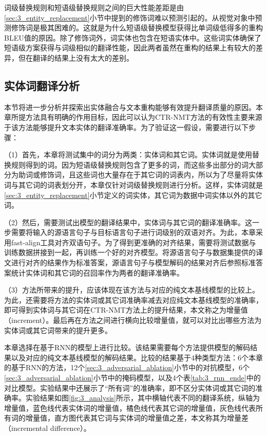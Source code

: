 词级替换规则和短语级替换规则之间的巨大性能差距是由\ref{sec:3_entity_replacement}小节中提到的修饰词难以预测引起的。从视觉对象中预测修饰词是极其困难的。这就是为什么短语级替换模型获得比单词级低得多的重构BLEU值的原因。除了修饰词外，词实体也包含在短语实体中。这些词实体确保了短语级方案获得与词级相似的翻译性能，因此两者虽然在重构的结果上有较大的差异，但在翻译的结果上没有太大的差别。

\subsection{实体词翻译分析}
\label{sec:3_entity_analysis}
本节将进一步分析并探索出实体融合与文本重构能够有效提升翻译质量的原因。本章所提方法具有明确的作用目标，因此可以认为CTR-NMT方法的有效性主要来源于该方法能够提升文本实体的翻译准确率。为了验证这一假设，需要进行以下步骤：

（1）首先，本章将测试集中的词分为两类：实体词和其它词。实体词就是使用替换规则得到的词。因为短语级替换规则包含了更多的词，而这些多出部分的词大部分为助词或修饰词，且这些词也大量存在于其它词的词表内，所以为了尽量将实体词与其它词的词表划分开，本章仅针对词级替换规则进行分析。这样，实体词就是\ref{sec:3_entity_replacement}小节定义的词实体，其它词为数据中词实体以外的其它词。

（2）然后，需要测试出模型的翻译结果中，实体词与其它词的翻译准确率。这一步需要将输入的源语言句子与目标语言句子进行词级别的双语对齐。为此，本章采用fast-align工具对齐双语句子。为了得到更准确的对齐结果，需要将测试数据与训练数据拼接到一起，再训练一个好的对齐模型。将源语言句子与数据集提供的译文进行对齐的结果作为标准答案，源语言句子与模型解码的结果对齐后参照标准答案统计实体词和其它词的召回率作为两者的翻译准确率。

（3）方法所带来的提升，应该体现在该方法与对应的纯文本基线模型的比较上。为此，还需要将方法的实体词或其它词准确率减去对应纯文本基线模型的准确率，即可得到实体词与其它词在CTR-NMT方法上的提升结果，本文称之为增量值（increment）。最后再在方法之间进行横向比较增量值，就可以对比出哪些方法为实体词或其它词带来的提升更多。


本章选择在基于RNN的模型上进行比较。该结果需要每个方法提供模型的解码结果以及对应的纯文本基线模型的解码结果。比较的结果基于4种类型方法：6个本章的基于RNN的方法，12个\ref{sec:3_adversarial_ablation}小节中的对抗模型，6个\ref{sec:3_adversarial_ablation}小节中的掩码模型，以及4个表\ref{tab:3_rnn_ende}中的对比模型。实验结果中还展示了“所有词”的准确率，即不区分实体词或其它词的准确率。实验结果如图\ref{fig:3_analysis}所示，其中横轴代表不同的翻译系统，纵轴为增量值，蓝色线代表实体词的增量值，橘色线代表其它词的增量值，灰色线代表所有词的增量值，直方图代表其它词与实体词的增量值之差，本文称其为增量差（incremental difference）。

